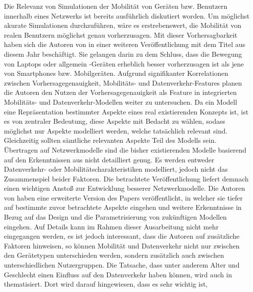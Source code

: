 \documentclass[12pt, a4paper]{article}
\begin{document}
Die Relevanz von Simulationen der Mobilität von Geräten bzw. Benutzern innerhalb eines Netzwerks
ist bereits ausführlich diskutiert worden. Um möglichst akurate Simulationen durchzuführen, wäre es erstrebenswert,
die Mobilität von realen Benutzern möglichst genau vorherzusagen. Mit dieser Vorhersagbarkeit haben sich die Autoren
von \cite{Alipour2018} in einer weiteren Veröffentlichung mit dem Titel \cite{Alipour2019} aus diesem Jahr beschäftigt.
Sie gelangen darin zu dem Schluss, dass die Bewegung von Laptops oder allgemein -Geräten
erheblich besser vorherzusagen ist als jene von Smartphones bzw. Mobilgeräten.\newline
Aufgrund signifikanter Korrelationen zwischen Vorhersagegenauigkeit, Mobilitäts- und Datenverkehr-Features
planen die Autoren den Nutzen der Vorhersagegenauigkeit als Feature in integrierten Mobilitäts- und Datenverkehr-Modellen
weiter zu untersuchen.
\newline\newline
Da ein Modell eine Repräsentation bestimmter Aspekte eines real existierenden Konzepts ist,
ist es von zentraler Bedeutung, diese Aspekte mit Bedacht zu wählen, sodass möglichst nur
Aspekte modelliert werden, welche tatsächlich relevant sind. Gleichzeitig sollten sämtliche relevanten
Aspekte Teil des Modells sein. Übertragen auf Netzwerkmodelle sind die bisher existierenden Modelle
basierend auf den Erkenntnissen aus \cite{Alipour2018} nicht detailliert genug. Es werden entweder
Datenverkehr- oder Mobilitätscharakteristiken modelliert, jedoch nicht das Zusammenspiel beider Faktoren.
Die betrachtete Veröffentlichung liefert demnach einen wichtigen Anstoß zur Entwicklung besserer Netzwerkmodelle.\newline
Die Autoren von \cite{Alipour2018} haben eine erweiterte Version des Papers veröffentlicht,
in welcher sie tiefer auf bestimmte zuvor betrachtete Aspekte eingehen und weitere Erkenntnisse in Bezug
auf das Design und die Parametrisierung von zukünftigen Modellen eingehen.
Auf Details kann im Rahmen dieser Ausarbeitung nicht mehr eingegangen werden, es ist jedoch interessant,
dass die Autoren auf zusätzliche Faktoren hinweisen, so können Mobilität und Datenverkehr nicht nur
zwischen den Gerätetypen unterschieden werden, sondern zusätzlich auch zwischen unterschiedlichen Nutzergruppen.
Die Tatsache, dass unter anderem Alter und Geschlecht einen Einfluss auf den Datenverkehr haben können,
wird auch in \cite{Oliveira2014} thematisiert. Dort wird darauf hingewiesen, dass es sehr wichtig ist,
\end{document}
